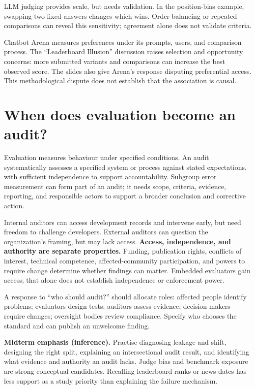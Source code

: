 \documentclass[11pt,letterpaper]{article}
\begin{document}
LLM judging provides scale, but needs validation. In the position-bias example,
swapping two fixed answers changes which wins. Order balancing or repeated
comparisons can reveal this sensitivity; agreement alone does not validate criteria.

Chatbot Arena measures preferences under its prompts, users, and comparison
process. The ``Leaderboard Illusion'' discussion raises selection and opportunity
concerns: more submitted variants and comparisons can increase the best observed
score. The slides also give Arena's response disputing preferential access.
This methodological dispute does not establish that the association is causal.

\section*{When does evaluation become an audit?}
Evaluation measures behaviour under specified conditions. An audit systematically
assesses a specified system or process against stated expectations, with sufficient
independence to support accountability. Subgroup error measurement can form part
of an audit; it needs scope, criteria, evidence, reporting, and responsible actors
to support a broader conclusion and corrective action.

Internal auditors can access development records and intervene early, but need
freedom to challenge developers. External auditors can question the organization's
framing, but may lack access. \textbf{Access, independence, and authority are
separate properties.} Funding, publication rights, conflicts of interest,
technical competence, affected-community participation, and powers to require
change determine whether findings can matter. Embedded evaluators gain access;
that alone does not establish independence or enforcement power.

A response to ``who should audit?'' should allocate roles: affected people identify
problems; evaluators design tests; auditors assess evidence; decision makers require
changes; oversight bodies review compliance. Specify who chooses the standard and
can publish an unwelcome finding.

\textbf{Midterm emphasis (inference).} Practise diagnosing leakage and shift,
designing the right split, explaining an intersectional audit result, and identifying
what evidence and authority an audit lacks. Judge bias and benchmark exposure are
strong conceptual candidates. Recalling leaderboard ranks or news dates has less
support as a study priority than explaining the failure mechanism.

\end{document}
